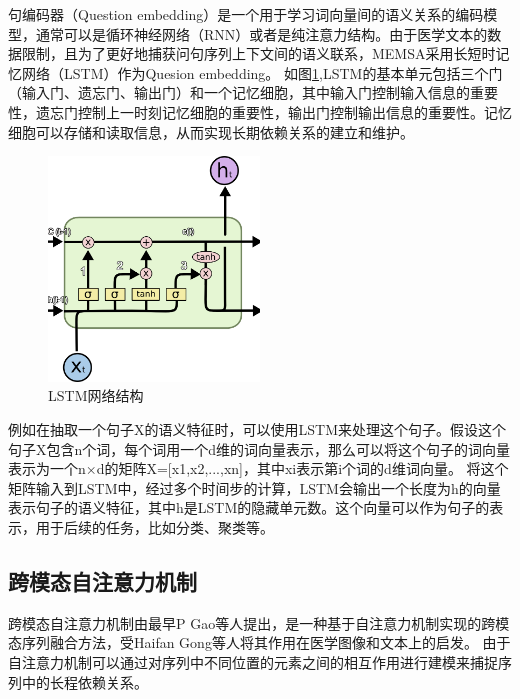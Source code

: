 \begin{enumerate}[topsep = 0 pt, itemsep= 0 pt, parsep=0pt, partopsep=0pt, leftmargin=44pt, itemindent=0pt, labelsep=6pt, label=(\arabic*)]
	句编码器（Question embedding）是一个用于学习词向量间的语义关系的编码模型，通常可以是循环神经网络（RNN）或者是纯注意力结构。由于医学文本的数据限制，且为了更好地捕获问句序列上下文间的语义联系，MEMSA采用长短时记忆网络\cite{Long short-term memory}（LSTM）作为Quesion embedding。
	如图\ref{fig:lstm},LSTM的基本单元包括三个门（输入门、遗忘门、输出门）和一个记忆细胞，其中输入门控制输入信息的重要性，遗忘门控制上一时刻记忆细胞的重要性，输出门控制输出信息的重要性。记忆细胞可以存储和读取信息，从而实现长期依赖关系的建立和维护。
	\begin{figure}[htbp]
		\centering	
		\includegraphics[width=0.5\textwidth]{Fig/myfig/chapter3/lstm.png}  %
		\caption{\label{fig:lstm}LSTM网络结构} 
	\end{figure}
	例如在抽取一个句子X的语义特征时，可以使用LSTM来处理这个句子。假设这个句子X包含n个词，每个词用一个d维的词向量表示，那么可以将这个句子的词向量表示为一个n×d的矩阵X=[x1,x2,...,xn]，其中xi表示第i个词的d维词向量。
	将这个矩阵输入到LSTM中，经过多个时间步的计算，LSTM会输出一个长度为h的向量表示句子的语义特征，其中h是LSTM的隐藏单元数。这个向量可以作为句子的表示，用于后续的任务，比如分类、聚类等。
\end{enumerate}

\subsection{跨模态自注意力机制}
跨模态自注意力机制由最早P Gao等人\cite{gao2019dynamic}提出，是一种基于自注意力机制实现的跨模态序列融合方法，受Haifan Gong等人\cite{gong2021cross}将其作用在医学图像和文本上的启发。
由于自注意力机制可以通过对序列中不同位置的元素之间的相互作用进行建模来捕捉序列中的长程依赖关系。

